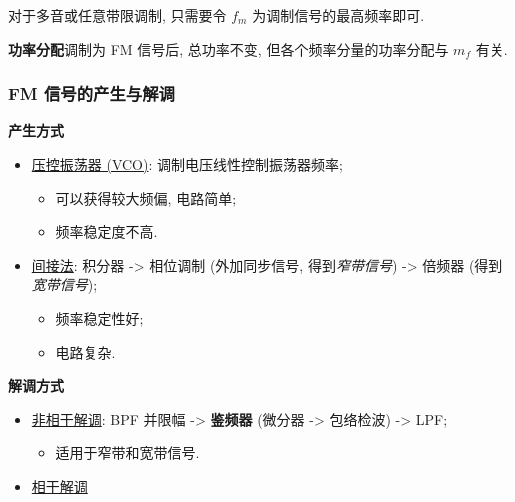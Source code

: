 对于多音或任意带限调制, 只需要令 $f_m$ 为调制信号的最高频率即可.

\textbf{功率分配}\quad 调制为 FM 信号后, 总功率不变, 但各个频率分量的功率分配与 $m_f$ 有关.

\subsubsection{FM 信号的产生与解调}
\textbf{产生方式}
\begin{itemize}
    \item \underline{压控振荡器 (VCO)}: 调制电压线性控制振荡器频率;
          \begin{itemize}
              \item 可以获得较大频偏, 电路简单;
              \item 频率稳定度不高.
          \end{itemize}
    \item \underline{间接法}: 积分器 -> 相位调制 (外加同步信号, 得到\textit{窄带信号}) -> 倍频器 (得到\textit{宽带信号});
          \begin{itemize}
              \item 频率稳定性好;
              \item 电路复杂.
          \end{itemize}
\end{itemize}

\textbf{解调方式}
\begin{itemize}
    \item \underline{非相干解调}: BPF 并限幅 -> \textbf{鉴频器} (微分器 -> 包络检波) -> LPF;
          \begin{itemize}
              \item 适用于窄带和宽带信号.
          \end{itemize}
    \item \underline{相干解调}
\end{itemize}
